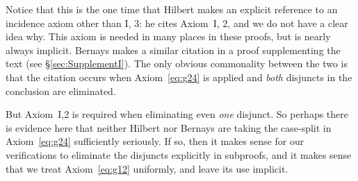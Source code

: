 \label{sec:g12Erratic}Notice that this is the one time that Hilbert makes an explicit reference to an incidence axiom other than I, 3: he cites Axiom~I, 2, and we do not have a clear idea why. This axiom is needed in many places in these proofs, but is nearly always implicit. Bernays makes a similar citation in a proof supplementing the text (see \S\ref{sec:SupplementI}). The only obvious commonality between the two is that the citation occurs when Axiom~\ref{eq:g24} is applied and \emph{both} disjuncts in the conclusion are eliminated. 

But Axiom~I,2 is required when eliminating even \emph{one} disjunct. So perhaps there is evidence here that neither Hilbert nor Bernays are taking the case-split in Axiom~\ref{eq:g24} sufficiently seriously. If so, then it makes sense for our verifications to eliminate the disjuncts explicitly in subproofs, and it makes sense that we treat Axiom~\ref{eq:g12} uniformly, and leave its use implicit.

